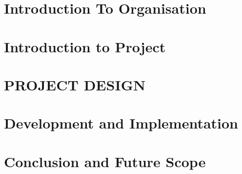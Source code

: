 \documentclass[12pt,includeheadfoot,a4paper]{report}
\begin{document}


\thispagestyle{empty}
\pagetitle
\newpage
{}
\cfoot{\thepage}



\newpage


\newpage
\tableofcontents
\newpage
\listoffigures
\newpage
\listoftables
\newpage


\cfoot{\thepage}


\newpage

\chapter{Introduction To Organisation}


\newpage

\chapter{Introduction to Project}



\chapter{PROJECT DESIGN}












%
%
%


%

\chapter{Development and Implementation}

%
%




\chapter{Conclusion and Future Scope}


%


\end{document}
